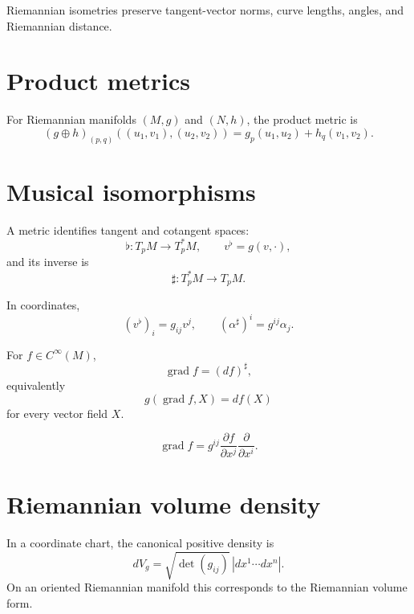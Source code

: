 \begin{proposition}\label{prop:vii20-isometry-length}
Riemannian isometries preserve tangent-vector norms, curve lengths, angles, and
Riemannian distance.
\end{proposition}

\section{Product metrics}

\begin{definition}\label{def:vii20-product}
For Riemannian manifolds \((M,g)\) and \((N,h)\), the product metric is
\[
(g\oplus h)_{(p,q)}((u_1,v_1),(u_2,v_2))
=
g_p(u_1,u_2)+h_q(v_1,v_2).
\]
\end{definition}

\section{Musical isomorphisms}

\begin{definition}\label{def:vii20-musical}
A metric identifies tangent and cotangent spaces:
\[
\flat:T_pM\to T_p^*M,\qquad
v^\flat=g(v,\cdot),
\]
and its inverse is
\[
\sharp:T_p^*M\to T_pM.
\]
\end{definition}

In coordinates,
\[
(v^\flat)_i=g_{ij}v^j,
\qquad
(\alpha^\sharp)^i=g^{ij}\alpha_j.
\]

\begin{definition}[Gradient]\label{def:vii20-gradient}
For \(f\in C^\infty(M)\),
\[
\operatorname{grad}f=(df)^\sharp,
\]
equivalently
\[
g(\operatorname{grad}f,X)=df(X)
\]
for every vector field \(X\).
\end{definition}

\begin{proposition}\label{prop:vii20-gradient-coord}
\[
\operatorname{grad}f
=
g^{ij}\frac{\partial f}{\partial x^j}\frac{\partial}{\partial x^i}.
\]
\end{proposition}

\section{Riemannian volume density}

\begin{definition}\label{def:vii20-density}
In a coordinate chart, the canonical positive density is
\[
dV_g=\sqrt{\det(g_{ij})}\,|dx^1\cdots dx^n|.
\]
On an oriented Riemannian manifold this corresponds to the Riemannian volume form.
\end{definition}

